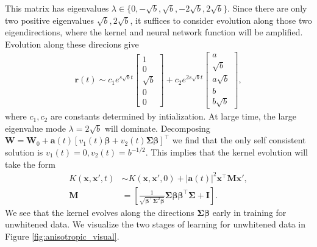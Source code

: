 \documentclass{article} %
\def\x{\bm x}
\begin{document}
\begin{appendix}
This matrix has eigenvalues $\lambda \in \{0, -\sqrt{b}, \sqrt{b}, - 2\sqrt{b}, 2\sqrt{b}\}$. Since there are only two positive eigenvalues $\sqrt{b}, 2\sqrt{b}$, it suffices to consider evolution along those two eigendirections, where the kernel and neural network function will be amplified. Evolution along these direcions give
\begin{align}
    \bm r(t) \sim c_1 e^{s \sqrt{b} t} \begin{bmatrix}
    1 \\
    0 \\
    \sqrt{b} \\
    0 \\
    0
    \end{bmatrix} + c_2 e^{2 s  \sqrt{b} t}
    \begin{bmatrix}
    a
    \\
    \sqrt{b}
    \\
    a\sqrt{b}
    \\
    b
    \\
    b\sqrt{b}
    \end{bmatrix} ,
\end{align}
where $c_1,c_2$ are constants determined by intialization. At large time, the large eigenvalue mode $\lambda = 2\sqrt{b}$ will dominate. Decomposing $\bm W = \bm W_0 + \bm a(t) \left[ v_1(t) \bm\beta + v_2(t) \bm \Sigma \bm\beta \right]^{\top}$ we find that the only self consistent solution is $v_1(t) = 0, v_2(t) = b^{-1/2}$. This implies that the kernel evolution will take the form
\begin{equation}
\begin{aligned}
    K(\x,\x',t) &\sim K(\x,\x',0) + |\bm a(t)|^2  \x^\top \bm M \x',
    \\
    \bm M &= \left[ \frac{1}{\sqrt{\bm\beta^\top \bm\Sigma^2 \bm \beta}} \bm \Sigma \bm \beta\bm\beta^\top \bm\Sigma +  \bm I  \right].
\end{aligned}
\end{equation}
We see that the kernel evolves along the directions $\bm\Sigma\bm\beta$ early in training for unwhitened data. We visualize the two stages of learning for unwhitened data in Figure \ref{fig:anisotropic_visual}. 
\begin{figure}
    \centering

\end{figure}
\end{appendix}
\end{document}
